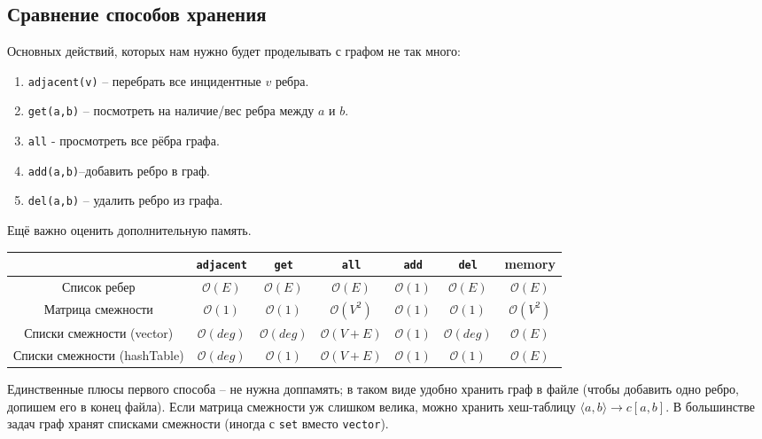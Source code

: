 \subsection*{Сравнение способов хранения}
Основных действий, которых нам нужно будет проделывать с графом не так много:
\begin{enumerate}
    \item\lstinline!adjacent(v)! – перебрать все инцидентные $v$ ребра.
    \item\lstinline!get(a,b)! – посмотреть на наличие/вес ребра между $a$ и $b$.
    \item\lstinline!all! - просмотреть все рёбра графа.
    \item\lstinline!add(a,b)!–добавить ребро в граф.
    \item\lstinline!del(a,b)! – удалить ребро из графа.
\end{enumerate}
Ещё важно оценить дополнительную память.
\begin{table}[]
    \begin{tabular}{|c|c|c|c|c|c|c|}
        \hline
        & \lstinline!adjacent! & \lstinline!get! &\lstinline!all! & \lstinline!add! & \lstinline!del! & memory \\
        \hline
        Список ребер & $\mathcal{O}(E)$ & $\mathcal{O}(E)$ & $\mathcal{O}(E)$ & $\mathcal{O}(1)$ & $\mathcal{O}(E)$ & $\mathcal{O}(E)$ \\
        \hline
        Матрица смежности & $\mathcal{O}(1)$ & $\mathcal{O}(1)$ & $\mathcal{O}(V^2)$ & $\mathcal{O}(1)$ & $\mathcal{O}(1)$ & $\mathcal{O}(V^2)$ \\
        \hline
        Списки смежности (vector) & $\mathcal{O}(deg)$ & $\mathcal{O}(deg)$ & $\mathcal{O}(V+E)$ & $\mathcal{O}(1)$ & $\mathcal{O}(deg)$ & $\mathcal{O}(E)$ \\
        \hline
        Списки смежности (hashTable) & $\mathcal{O}(deg)$ & $\mathcal{O}(1)$ & $\mathcal{O}(V+E)$ & $\mathcal{O}(1)$ & $\mathcal{O}(1)$ & $\mathcal{O}(E)$ \\
        \hline
    \end{tabular}
\end{table}

Единственные плюсы первого способа – не нужна доппамять; в таком виде удобно хранить граф в файле (чтобы добавить одно ребро, допишем его в конец файла).
Если матрица смежности уж слишком велика, можно хранить хеш-таблицу $\langle a,b\rangle\rightarrow c[a,b]$.
В большинстве задач граф хранят списками смежности (иногда с \lstinline!set! вместо \lstinline!vector!).

